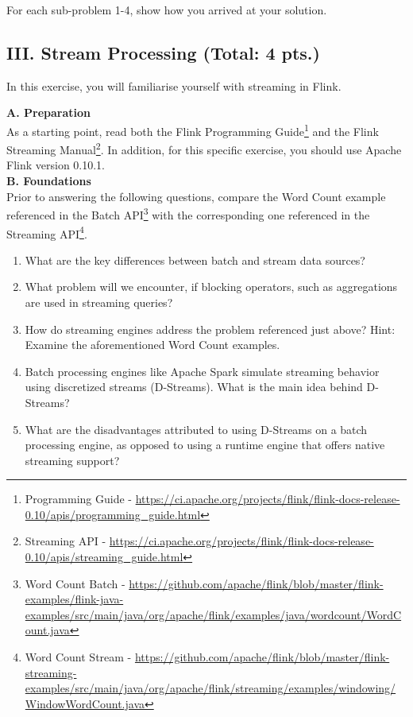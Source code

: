 \documentclass[11pt,a4paper]{article}
\newenvironment{cEnum}{
\begin{enumerate}
  \setlength{\itemsep}{0pt}
  \setlength{\parskip}{0pt}
  \setlength{\parsep}{0pt}
}{\end{enumerate}}
\begin{document}
For each sub-problem 1-4, show how you arrived at your solution.


\subsection*{III. Stream Processing (Total: 4 pts.)}
In this exercise, you will familiarise yourself with streaming in Flink. 

\textbf{A. Preparation}\\
As a starting point, read both the Flink Programming Guide\footnote{Programming Guide - \url{https://ci.apache.org/projects/flink/flink-docs-release-0.10/apis/programming_guide.html}} and the Flink Streaming Manual\footnote{Streaming API - \url{https://ci.apache.org/projects/flink/flink-docs-release-0.10/apis/streaming_guide.html}}. In addition, for this specific exercise, you should use Apache Flink version 0.10.1.\\

\textbf{B. Foundations}\\
Prior to answering the following questions, compare the Word Count example referenced in the Batch API\footnote{Word Count Batch - \url{https://github.com/apache/flink/blob/master/flink-examples/flink-java-examples/src/main/java/org/apache/flink/examples/java/wordcount/WordCount.java}} with the corresponding one referenced in the Streaming API\footnote{Word Count Stream - \url{https://github.com/apache/flink/blob/master/flink-streaming-examples/src/main/java/org/apache/flink/streaming/examples/windowing/WindowWordCount.java}}.

\begin{cEnum}
	\item What are the key differences between batch and stream data sources? 
	\item What problem will we encounter, if blocking operators, such as aggregations are used in streaming queries?
	\item How do streaming engines address the problem referenced just above? Hint: Examine the aforementioned Word Count examples.
	\item Batch processing engines like Apache Spark simulate streaming behavior using discretized streams (D-Streams). What is the main idea behind D-Streams?	
	\item What are the disadvantages attributed to using D-Streams on a batch processing engine, as opposed to using a runtime engine that offers native streaming support?
\end{cEnum}
\end{document}
